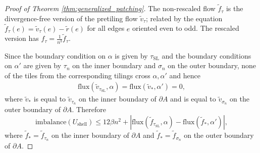 \documentclass[11pt]{article}
\theoremstyle{remark}
\theoremstyle{definition}
\begin{document}
\begin{proof}[Proof of Theorem \ref{thm:generalized_patching}]
    The non-rescaled flow $\widetilde f_\tau$ is the divergence-free version of the pretiling flow $\widetilde v_\tau$; related by the equation $\widetilde f_\tau(e) = \widetilde v_\tau(e) - \widetilde r(e)$ for all edges $e$ oriented even to odd. The rescaled version has $f_\tau = \frac{1}{n^3} \widetilde f_\tau$.
    
    Since the boundary condition on $\alpha$ is given by $\tau_{\text{SL}}$ and the boundary conditions on $\alpha'$ are given by $\tau_n$ on the inner boundary and $\sigma_n$ on the outer boundary, none of the tiles from the corresponding tilings cross $\alpha,\alpha'$ and hence
    \begin{align*}
        \text{flux}(\widetilde v_{\tau_{\text{SL}}},\alpha) = \text{flux}(\widetilde v_\ast,\alpha') = 0,
    \end{align*}
    where $\widetilde v_\ast$ is equal to $\widetilde v_{\tau_n}$ on the inner boundary of $\partial A$ and is equal to $\widetilde v_{\sigma_n}$ on the outer boundary of $\partial A$. Therefore
    \begin{equation}\label{eq:imbalanace_as_flux}
         \text{imbalance}(U_\text{shell})  \leq 12\beta n^2 + |\text{flux}(\widetilde f_{\tau_{\text{SL}}},\alpha) - \text{flux}(\widetilde f_{\ast},\alpha')|,
    \end{equation}
    where $\widetilde f_{\ast} = \widetilde f_{\tau_n}$ on the inner boundary of $\partial A$ and $\widetilde f_{\ast}=\widetilde f_{\sigma_n}$ on the outer boundary of $\partial A$.


\end{proof}
\end{document}
